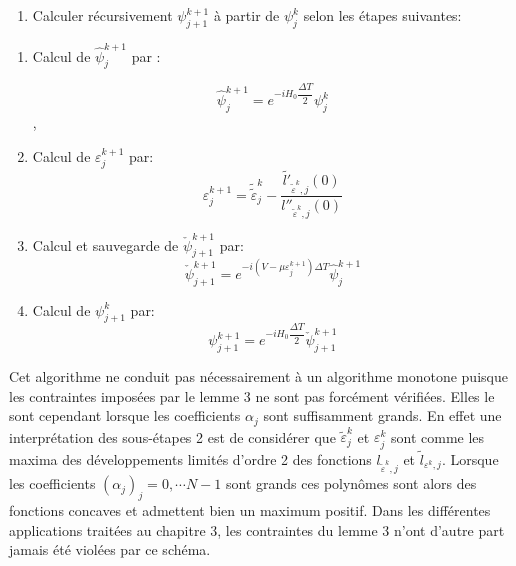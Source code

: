 \begin{enumerate}
	\item[\textbullet] Calculer récursivement $\psi_{j+1}^{k+1}$ à partir de $\psi_j^k$ selon les étapes suivantes:
\end{enumerate}
\begin{enumerate}
	\item Calcul de $\widehat{\psi}_j^{k+1}$ par :
	
	$$\widehat{\psi}_j^{k+1} = e^{-i H_0 \dfrac{\Delta T}{2}} \psi_j^k$$,
	\item Calcul de $\varepsilon_j^{k+1}$ par: $$\varepsilon_j^{k+1} = \tilde{\tilde{\varepsilon}}_j^k - \dfrac{\tilde{l'}_{\tilde{\varepsilon}^k,j}(0)}{l''_{\tilde{\varepsilon}^k,j}(0)}$$
	\item Calcul et sauvegarde de $\check{\psi}_{j+1}^{k+1}$ par:
	$$\check{\psi}_{j+1}^{k+1} = e^{-i(V-\mu \varepsilon_j^{k+1})\Delta T} \widehat{\psi}_j^{k+1}$$
	\item Calcul de $\psi_{j+1}^k$ par:
	$$\psi_{j+1}^{k+1} = e^{-i H_0 \dfrac{\Delta T}{2}} \check{\psi}_{j+1}^{k+1}$$
\end{enumerate}

Cet algorithme ne conduit pas nécessairement à un algorithme monotone puisque les contraintes imposées par le lemme 3 ne sont pas forcément vérifiées. Elles le sont cependant lorsque les coefficients $\alpha_j$ sont suffisamment grands. En effet une interprétation des sous-étapes 2 est de considérer que $\tilde{\varepsilon}_j^k$ et $\varepsilon_j^k$ sont comme les maxima des développements limités d'ordre 2 des fonctions $l_{\tilde{\varepsilon}^k,j}$ et $\tilde{l}_{{\varepsilon^k},j}$. Lorsque les coefficients $(\alpha_j)_j=0, \cdots N-1$ sont grands ces polynômes sont alors des fonctions concaves et admettent bien un maximum positif.
Dans les différentes applications traitées au chapitre 3, les contraintes du lemme 3 n'ont d'autre part jamais été violées par ce schéma.

